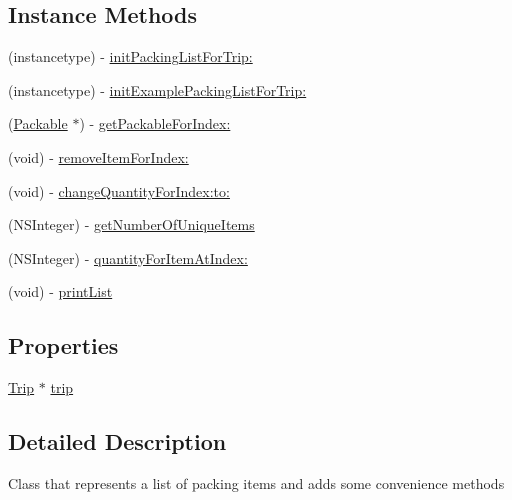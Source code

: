 \subsection*{Instance Methods}
\begin{DoxyCompactItemize}
\item 
(instancetype) -\/ \hyperlink{interface_packing_list_ad2a2047f09bda181d360593acb068cab}{init\-Packing\-List\-For\-Trip\-:}
\item 
(instancetype) -\/ \hyperlink{interface_packing_list_a1a06132f16892f9379ded65f2365362b}{init\-Example\-Packing\-List\-For\-Trip\-:}
\item 
(\hyperlink{interface_packable}{Packable} $\ast$) -\/ \hyperlink{interface_packing_list_a09a1d6b99216336d3de2f1d39983e4fd}{get\-Packable\-For\-Index\-:}
\item 
(void) -\/ \hyperlink{interface_packing_list_a0eeb9568c172bfc8ff5194ea9b31dc40}{remove\-Item\-For\-Index\-:}
\item 
(void) -\/ \hyperlink{interface_packing_list_ac17f7681dfe6d6fd48610412c6c81d6a}{change\-Quantity\-For\-Index\-:to\-:}
\item 
(N\-S\-Integer) -\/ \hyperlink{interface_packing_list_abc46addde8828e6e414100851eac731e}{get\-Number\-Of\-Unique\-Items}
\item 
(N\-S\-Integer) -\/ \hyperlink{interface_packing_list_a4b7a74a055c78ad2c84365b9fd2567cd}{quantity\-For\-Item\-At\-Index\-:}
\item 
(void) -\/ \hyperlink{interface_packing_list_a91482348b38c1a7762a08e914306714f}{print\-List}
\end{DoxyCompactItemize}
\subsection*{Properties}
\begin{DoxyCompactItemize}
\item 
\hyperlink{interface_trip}{Trip} $\ast$ \hyperlink{interface_packing_list_a12ca48b216cfbdc18f1e34849d17adb4}{trip}
\end{DoxyCompactItemize}


\subsection{Detailed Description}
Class that represents a list of packing items and adds some convenience methods 

